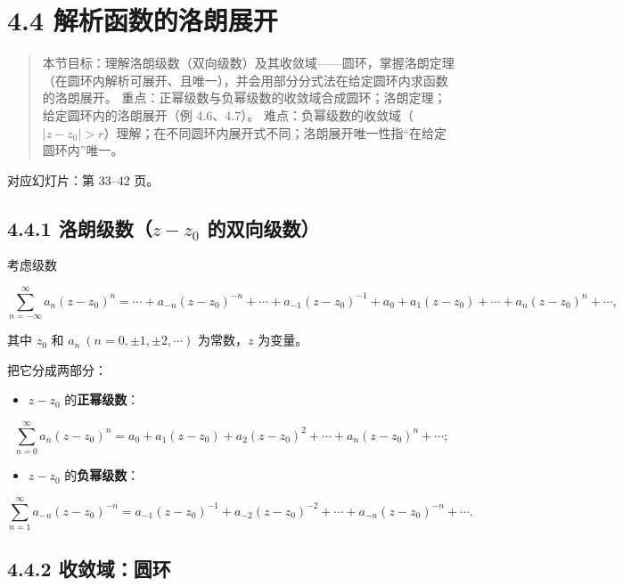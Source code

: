 \section{4.4
解析函数的洛朗展开}\label{ux89e3ux6790ux51fdux6570ux7684ux6d1bux6717ux5c55ux5f00}

\begin{quote}
本节目标：理解洛朗级数（双向级数）及其收敛域------圆环，掌握洛朗定理（在圆环内解析可展开、且唯一），并会用部分分式法在给定圆环内求函数的洛朗展开。
重点：正幂级数与负幂级数的收敛域合成圆环；洛朗定理；给定圆环内的洛朗展开（例
4.6、4.7）。
难点：负幂级数的收敛域（\(|z-z_0|>r\)）理解；在不同圆环内展开式不同；洛朗展开唯一性指``在给定圆环内''唯一。
\end{quote}

对应幻灯片：第 33--42 页。

\subsection{\texorpdfstring{4.4.1 洛朗级数（\(z-z_0\)
的双向级数）}{4.4.1 洛朗级数（z-z\_0 的双向级数）}}\label{ux6d1bux6717ux7ea7ux6570z-z_0-ux7684ux53ccux5411ux7ea7ux6570}

考虑级数

\[
\sum_{n=-\infty}^{\infty}a_n(z-z_0)^n=\cdots+a_{-n}(z-z_0)^{-n}+\cdots+a_{-1}(z-z_0)^{-1}+a_0+a_1(z-z_0)+\cdots+a_n(z-z_0)^n+\cdots,
\]

其中 \(z_0\) 和 \(a_n\ (n=0,\pm1,\pm2,\cdots)\) 为常数，\(z\) 为变量。

把它分成两部分：

\begin{itemize}
\tightlist
\item
  \(z-z_0\) 的\textbf{正幂级数}：
\end{itemize}

\[
\sum_{n=0}^{\infty}a_n(z-z_0)^n=a_0+a_1(z-z_0)+a_2(z-z_0)^2+\cdots+a_n(z-z_0)^n+\cdots;
\]

\begin{itemize}
\tightlist
\item
  \(z-z_0\) 的\textbf{负幂级数}：
\end{itemize}

\[
\sum_{n=1}^{\infty}a_{-n}(z-z_0)^{-n}=a_{-1}(z-z_0)^{-1}+a_{-2}(z-z_0)^{-2}+\cdots+a_{-n}(z-z_0)^{-n}+\cdots .
\]

\subsection{4.4.2 收敛域：圆环}\label{ux6536ux655bux57dfux5706ux73af}

